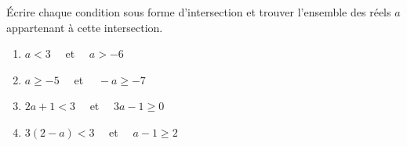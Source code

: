 \begin{exo}{}
	Écrire chaque condition sous forme d'intersection et trouver l'ensemble des réels $a$ appartenant à cette intersection.

	\begin{enumerate}[itemsep=2mm]
		\item $a < 3\quad$ et $\quad a > -6$
		\item $a \ge -5\quad$ et $\quad -a \ge -7$
		\item $2a + 1 < 3\quad$ et $\quad 3a - 1 \ge 0$
		\item $3(2 - a) < 3\quad$ et $\quad a - 1 \ge 2$
	\end{enumerate}
\end{exo}
